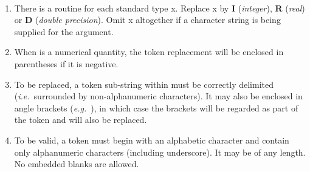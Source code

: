 {

}
{
  \\
}
{
}
{
}
{
}
\notes
{
  \begin{enumerate}
  \item There is a routine for each standard type x.
        Replace x by {\bf I} ({\em integer}), {\bf R} ({\em real}) or {\bf
        D} ({\em double precision}).
        Omit x altogether if a character string is being supplied for the 
         argument.
  \item When  is a numerical quantity, the token replacement
        will be enclosed in parentheses if it is negative.
  \item To be replaced, a token sub-string within  must be
        correctly delimited ({\em i.e.}\ surrounded by non-alphanumeric
        characters).
        It may also be enclosed in angle brackets ({\em e.g.}\
        ), in which case the brackets will be regarded
        as part of the token and will also be replaced. 
  \item To be valid, a token must begin with an alphabetic character and
        contain only alphanumeric characters (including underscore).
        It may be of any length.
        No embedded blanks are allowed. 
  \end{enumerate}
}

